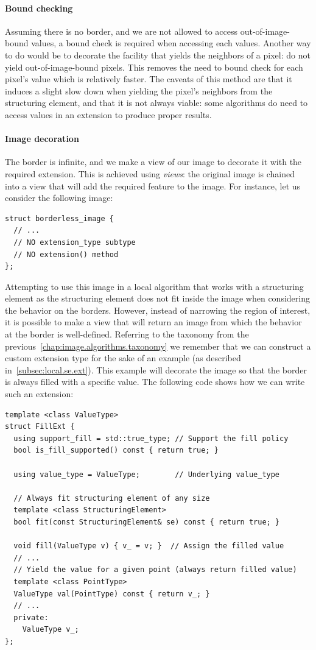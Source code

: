 \paragraph{Bound checking}
Assuming there is no border, and we are not allowed to access out-of-image-bound values, a bound check is required when
accessing each values. Another way to do would be to decorate the facility that yields the neighbors of a pixel: do not
yield out-of-image-bound pixels. This removes the need to bound check for each pixel's value which is relatively
faster. The caveats of this method are that it induces a slight slow down when yielding the pixel's neighbors from the
structuring element, and that it is not always viable: some algorithms do need to access values in an extension to
produce proper results.

\paragraph{Image decoration}
The border is infinite, and we make a view of our image to decorate it with the required extension. This is achieved
using \emph{views}: the original image is chained into a view that will add the required feature to the image. For
instance, let us consider the following image:
\begin{verbatim}
struct borderless_image {
  // ...
  // NO extension_type subtype
  // NO extension() method
};
\end{verbatim}

Attempting to use this image in a local algorithm that works with a structuring element as the structuring element does
not fit inside the image when considering the behavior on the borders. However, instead of narrowing the region of
interest, it is possible to make a view that will return an image from which the behavior at the border is well-defined.
Referring to the taxonomy from the previous~\cref{chap:image.algorithms.taxonomy} we remember that we can construct a
custom extension type for the sake of an example (as described in~\cref{subsec:local.se.ext}). This example will
decorate the image so that the border is always filled with a specific value. The following code shows how we can write
such an extension:
\begin{verbatim}
template <class ValueType>
struct FillExt {
  using support_fill = std::true_type; // Support the fill policy
  bool is_fill_supported() const { return true; }

  using value_type = ValueType;        // Underlying value_type

  // Always fit structuring element of any size
  template <class StructuringElement>
  bool fit(const StructuringElement& se) const { return true; }

  void fill(ValueType v) { v_ = v; }  // Assign the filled value
  // ...
  // Yield the value for a given point (always return filled value)
  template <class PointType>
  ValueType val(PointType) const { return v_; }
  // ...
  private:
    ValueType v_;
};
\end{verbatim}

